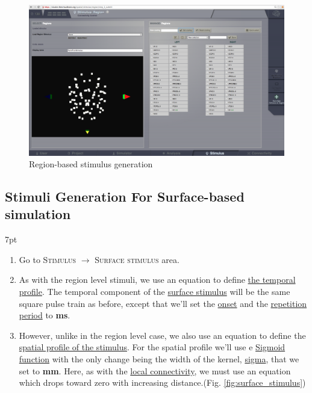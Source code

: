 \documentclass{tufte-handout}
\newenvironment{formal}{%
  \def\FrameCommand{%
    \hspace{1pt}%
    {\color{DarkBlue}\vrule width 2pt}%
    {\color{formalshade}\vrule width 4pt}%
    \colorbox{formalshade}%
  }%
  \MakeFramed{\advance\hsize-\width\FrameRestore}%
  \noindent\hspace{-4.55pt}%
  \begin{adjustwidth}{}{7pt}%
  \vspace{2pt}\vspace{2pt}%
}
{%
  \vspace{2pt}\end{adjustwidth}\endMakeFramed%
}
\begin{document}
\begin{figure}[h]
  \includegraphics[width=\linewidth]{Handout_UI_HeterogenousModelAndStimulation_StimulusRegionScaling}%
  \caption{Region-based stimulus generation}%
  \label{fig:save_scaling}%
\end{figure}


\newpage
\subsection{Stimuli Generation For Surface-based simulation}\label{sec:surface_stim}

\begin{formal}
\begin{enumerate}
\item Go to \textsc{Stimulus} $\rightarrow$ \textsc{Surface stimulus} area. 
\item As with the region level stimuli, we use an equation to define \underline{the temporal
profile}. The temporal component of the \underline{surface stimulus} will be the same square pulse train as before, except that we'll set the \underline{onset} and the \underline{repetition period} to \textbf{\unit[50]{ms}}.
\item  However, unlike in the region level case, we also use an equation to
define the \underline{spatial profile of the stimulus}. For the spatial profile we'll use e \underline{Sigmoid function} with the only change being the width of the kernel, \underline{sigma}, that we set to \textbf{\unit[10]{mm}}.  Here, as with the \underline{local connectivity}, we
must use an equation which drops toward zero with increasing distance.(Fig. \ref{fig:surface_stimulus})
\end{enumerate}
\end{formal}
\end{document}
